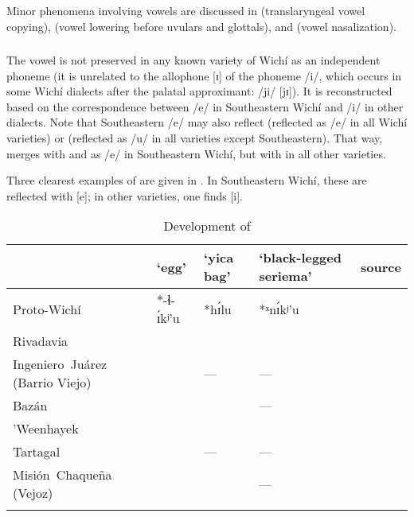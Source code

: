 Minor phenomena involving vowels are discussed in  (translaryngeal vowel copying),  (vowel lowering before uvulars and glottals), and  (vowel nasalization).

\subsubsection{}\label{wi-ɪ}

The vowel  is not preserved in any known variety of Wichí as an independent phoneme (it is unrelated to the allophone [ɪ] of the phoneme /i/, which occurs in some Wichí dialects after the palatal approximant: /ji/ [jɪ]). It is reconstructed based on the correspondence between /e/ in Southeastern Wichí and /i/ in other dialects. Note that Southeastern /e/ may also reflect  (reflected as /e/ in all Wichí varieties) or  (reflected as /u/ in all varieties except Southeastern). That way,  merges with  and  as /e/ in Southeastern Wichí, but with  in all other varieties.

Three clearest examples of  are given in . In Southeastern Wichí, these are reflected with [e]; in other varieties, one finds [i].

\begin{table}
\caption{Development of }
\label{wi-ie-ex}
 \begin{tabularx}{\textwidth}{QllQQ}
  \lsptoprule
            & `egg' & `yica bag' & `black-legged seriema' & source\\\midrule
  Proto-Wichí & *\mbox{-}ɬ\mbox{-}ɪ́kʲ’u & *hɪ́lu & *ˣnɪ́kʲ’u & \\
  \tablevspace
  Rivadavia &  &  &  & \citet[89–90, 274]{JT09-th}\\
  \tablevspace
  \mbox{Ingeniero Juárez} (Barrio Viejo) &  & — & — & \citet[360]{LCB15}\\
  \tablevspace
  Bazán &  &  & — & \citet[41, 50]{JB09}\\
  \tablevspace
  ’Weenhayek &  &  &  & \citet[32, 75, 150, 263]{KC16}\\
  \tablevspace
  Tartagal &  & — & — & \citet[360]{LCB15}\\
  \tablevspace
  \mbox{Misión Chaqueña} (Vejoz) &  &  & — & \citet[57, 106]{VU74}\\
  \lspbottomrule
 \end{tabularx}
\end{table}


